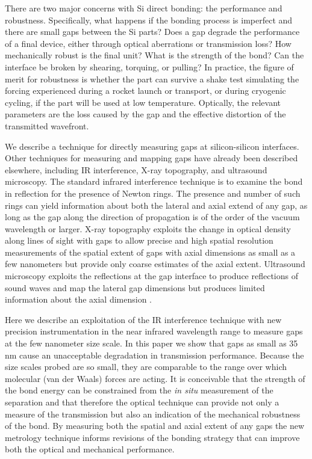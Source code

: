 \documentclass[osajnl,preprint,showpacs,superscriptaddress,12pt]{revtex4-1} %
\begin{document}
There are two major concerns with Si direct bonding: the performance and robustness.  Specifically, what happens if the bonding process is imperfect and there are small gaps between the Si parts?  Does a gap degrade the performance of a final device, either through optical aberrations or transmission loss?  How mechanically robust is the final unit?  What is the strength of the bond?  Can the interface be broken by shearing, torquing, or pulling?  In practice, the figure of merit for robustness is whether the part can survive a shake test simulating the forcing experienced during a rocket launch or transport, or during cryogenic cycling, if the part will be used at low temperature.  Optically, the relevant parameters are the loss caused by the gap and the effective distortion of the transmitted wavefront.

We describe a technique for directly measuring gaps at silicon-silicon interfaces.  Other techniques for measuring and mapping gaps have already been described elsewhere\cite{1992JEMat..21..669M}, including IR interference, X-ray topography, and ultrasound microscopy.  The standard infrared interference technique is to examine the bond in reflection for the presence of Newton rings.  The presence and number of such rings can yield information about both the lateral and axial extend of any gap, as long as the gap along the direction of propagation is of the order of the vacuum wavelength or larger.  X-ray topography \cite{1992JEMat..21..669M, 1994JaJAP..33....6H} exploits the change in optical density along lines of sight with gaps to allow precise and high spatial resolution measurements of the spatial extent of gaps with axial dimensions as small as a few nanometers but provide only coarse estimates of the axial extent.  Ultrasound microscopy exploits the reflections at the gap interface to produce reflections of sound waves and map the lateral gap dimensions but produces limited information about the axial dimension \cite{2000RScI...71.1869G}.

Here we describe an exploitation of the IR interference technique with new precision instrumentation in the near infrared wavelength range to measure gaps at the few nanometer size scale.  In this paper we show that gaps as small as 35 nm cause an unacceptable degradation in transmission performance.  Because the size scales probed are so small, they are comparable to the range over which molecular (van der Waals) forces are acting.  It is conceivable that the strength of the bond energy can be constrained from the \emph{in situ} measurement of the separation and that therefore the optical technique can provide not only a measure of the transmission but also an indication of the mechanical robustness of the bond.  By measuring both the spatial and axial extent of any gaps the new metrology technique informs revisions of the bonding strategy that can improve both the optical and mechanical performance.  
\end{document}
